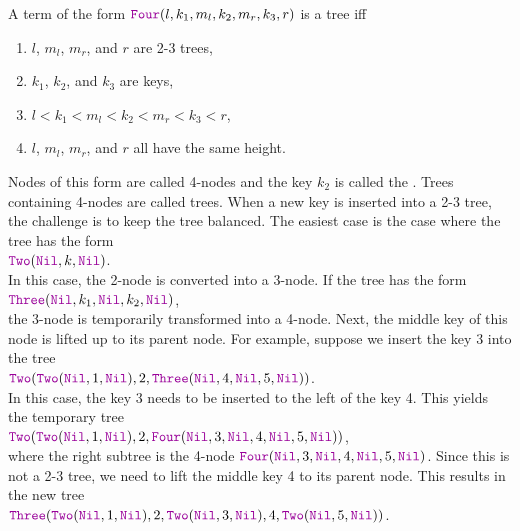 A term of the form $\mytt{Four}(l,k_1,m_l, k_2, m_r, k_3, r)$ is a  tree iff
\begin{enumerate}
\item $l$, $m_l$, $m_r$, and $r$ are 2-3 trees,
\item $k_1$, $k_2$, and $k_3$ are keys,
\item $l < k_1 < m_l < k_2 < m_r < k_3 < r$,
\item $l$, $m_l$, $m_r$, and $r$ all have the same height.
\end{enumerate}
Nodes of this form are called 4-nodes and the key $k_2$ is called the .
Trees containing 4-nodes are called  trees.
When a new key is inserted into a 2-3 tree, the challenge is to keep the tree balanced.  The easiest
case is the case where the tree has the form
\\[0.2cm]
\hspace*{1.3cm}
$\mytt{Two}(\mytt{Nil}, k, \mytt{Nil})$.
\\[0.2cm]
In this case, the 2-node is converted into a 3-node.  If the tree has the form 
\\[0.2cm]
\hspace*{1.3cm}
$\mytt{Three}(\mytt{Nil}, k_1, \mytt{Nil}, k_2, \mytt{Nil})$,
\\[0.2cm]
the 3-node is temporarily transformed into a 4-node.  Next, the middle key of this node is lifted up
to its parent node.  For example, suppose we insert the key 3 into the tree
\\[0.2cm]
\hspace*{1.3cm}
$\mytt{Two}(\mytt{Two}(\mytt{Nil}, 1, \mytt{Nil}), 2, \mytt{Three}(\mytt{Nil}, 4, \mytt{Nil}, 5, \mytt{Nil}))$.
\\[0.2cm]
In this case, the key 3 needs to be inserted to the left of the key 4.  This yields the temporary tree 
\\[0.2cm]
\hspace*{1.3cm}
$\mytt{Two}(\mytt{Two}(\mytt{Nil}, 1, \mytt{Nil}), 2, \mytt{Four}(\mytt{Nil}, 3, \mytt{Nil}, 4, \mytt{Nil}, 5, \mytt{Nil}))$,
\\[0.2cm]
where the right subtree is the 4-node $\mytt{Four}(\mytt{Nil}, 3, \mytt{Nil}, 4, \mytt{Nil}, 5, \mytt{Nil})$.
Since this is not a 2-3 tree, we need to lift the middle key 4 to its parent node.  This results in
the new tree
\\[0.2cm]
\hspace*{1.3cm}
$\mytt{Three}(\mytt{Two}(\mytt{Nil}, 1, \mytt{Nil}), 2, \mytt{Two}(\mytt{Nil}, 3, \mytt{Nil}), 4, \mytt{Two}(\mytt{Nil}, 5, \mytt{Nil}))$.
